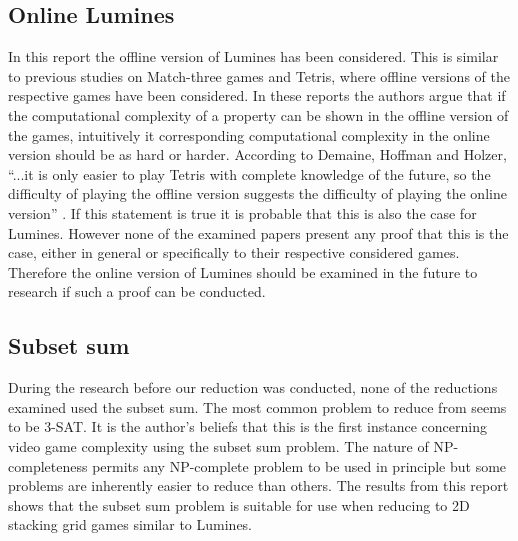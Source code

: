 \subsection{Online Lumines}

In this report the offline version of Lumines has been considered. This is similar to previous studies on Match-three games and Tetris, where offline versions of the respective games have been considered. In these reports the authors argue that if the computational complexity of a property can be shown in the offline version of the games, intuitively it corresponding computational complexity in the online version should be as hard or harder. According to Demaine, Hoffman and Holzer, ``...it is only easier to play Tetris with complete knowledge of the future, so the difficulty of playing the offline version suggests the difficulty of playing the online version'' \cite[p. 2]{tetris}. If this statement is true it is probable that this is also the case for Lumines. However none of the examined papers present any proof that this is the case, either in general or specifically to their respective considered games. Therefore the online version of Lumines should be examined in the future to research if such a proof can be conducted.

\subsection{Subset sum}

During the research before our reduction was conducted, none of the reductions examined used the subset sum. The most common problem to reduce from seems to be 3-SAT. It is the author's beliefs that this is the first instance concerning video game complexity using the subset sum problem. The nature of NP-completeness permits any NP-complete problem to be used in principle but some problems are inherently easier to reduce than others. The results from this report shows that the subset sum problem is suitable for use when reducing to 2D stacking grid games similar to Lumines. 
